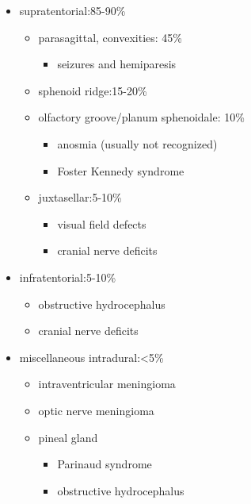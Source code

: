 \begin{itemize}
	\item
	supratentorial:85-90\%
	
	\begin{itemize}
		\item
		parasagittal, convexities: 45\%
		
		\begin{itemize}
			\item
			seizures and hemiparesis
		\end{itemize}
		\item
		sphenoid ridge:15-20\%
		\item
		olfactory groove/planum sphenoidale: 10\%
		
		\begin{itemize}
			\item
			anosmia (usually not recognized)
			\item
			Foster Kennedy syndrome
		\end{itemize}
		\item
		juxtasellar:5-10\%
		
		\begin{itemize}
			\item
			visual field defects
			\item
			cranial nerve deficits
		\end{itemize}
	\end{itemize}
	\item
	infratentorial:5-10\%
	
	\begin{itemize}
		\item
		obstructive hydrocephalus
		\item
		cranial nerve deficits
	\end{itemize}
	\item
	miscellaneous intradural:\textless5\%
	
	\begin{itemize}
		\item
		intraventricular meningioma
		\item
		optic nerve meningioma
		\item
		pineal gland
		
		\begin{itemize}
			\item
			Parinaud syndrome
			\item
			obstructive hydrocephalus
		\end{itemize}
	\end{itemize}
\end{itemize}

